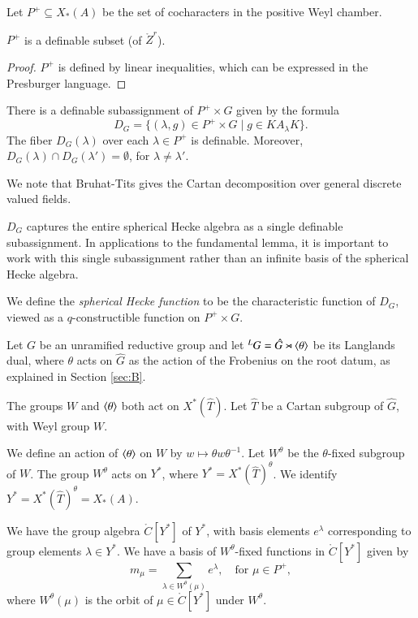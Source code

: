 Let $P^+\subseteq X_*(A)$ be the set of cocharacters in the positive Weyl chamber.

\begin{lemma} $P^+$ is a definable subset (of $\ring{Z}^r$).
\end{lemma}

\begin{proof} $P^+$ is defined by linear inequalities, which can be expressed in the Presburger language.
\end{proof}


\begin{lemma} There is a definable subassignment of $P^+\times G$ given by the formula
\[
D_G = \{(\lambda,g)\in P^+\times G \mid g \in K A_\lambda K \}.
\]
The fiber $D_G(\lambda)$ over each $\lambda\in P^+$ is definable.  Moreover,
$D_G(\lambda)\cap D_G(\lambda') = \emptyset$, for $\lambda\ne \lambda'$.
\end{lemma}


We note that Bruhat-Tits gives the Cartan decomposition over general discrete valued fields.

\begin{remark}   $D_G$ captures the entire spherical Hecke algebra as a single
definable subassignment.  In applications to the fundamental lemma, 
it is important to work with this single subassignment
rather than an infinite basis of the spherical Hecke algebra.
\end{remark}

We define the {\it spherical Hecke function} to be the characteristic function of $D_G$, viewed as a $q$-constructible function
on $P^+\times G$.

Let $G$ be an unramified reductive group and let ${}^LG = \hat G\rtimes \langle{\theta}\rangle$ be its Langlands dual, where
$\theta$ acts on $\hat G$ as the action of the Frobenius on the root datum, as explained in Section \ref{sec:B}.



The groups $W$ and $\langle{\theta}\rangle$ both act on $X^*(\hat T)$.  
Let $\hat T$ be a Cartan subgroup of $\hat G$, with Weyl group $W$.


We define an action of $\langle{\theta}\rangle$ on $W$ by
$w\mapsto \theta w \theta^{-1}$.  
Let $W^\theta$
be the $\theta$-fixed subgroup of $W$.   
The group $W^\theta$ acts on $Y^*$,  where $Y^* = X^*(\hat T)^\theta$.
We identify $Y^* =X^*(\hat T)^\theta = X_*(A)$.

We have  the group algebra $\ring{C}[Y^*]$ of $Y^*$, with basis elements
$e^\lambda$ corresponding to group elements $\lambda\in Y^*$.
We have a basis of $W^\theta$-fixed functions in $\ring{C}[Y^*]$ given by
\[
m_\mu = \sum_{\lambda\in W^\theta(\mu)} e^\lambda, \quad \text{for }\mu\in P^+,
\]
where $W^\theta(\mu)$ is the orbit of $\mu\in\ring{C}[Y^*]$ under $W^\theta$.

